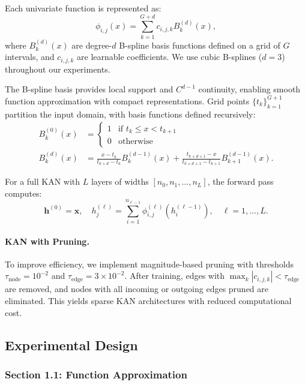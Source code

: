 \documentclass[11pt,a4paper]{article}
\begin{document}
Each univariate function is represented as:
\begin{equation}
\phi_{i,j}(x) = \sum_{k=1}^{G+d} c_{i,j,k} B_k^{(d)}(x),
\end{equation}
where $B_k^{(d)}(x)$ are degree-$d$ B-spline basis functions defined on a grid of $G$ intervals, and $c_{i,j,k}$ are learnable coefficients. We use cubic B-splines ($d=3$) throughout our experiments.

The B-spline basis provides local support and $C^{d-1}$ continuity, enabling smooth function approximation with compact representations. Grid points $\{t_k\}_{k=1}^{G+1}$ partition the input domain, with basis functions defined recursively:
\begin{align}
B_k^{(0)}(x) &= \begin{cases} 1 & \text{if } t_k \le x < t_{k+1} \\ 0 & \text{otherwise} \end{cases} \\
B_k^{(d)}(x) &= \frac{x - t_k}{t_{k+d} - t_k} B_k^{(d-1)}(x) + \frac{t_{k+d+1} - x}{t_{k+d+1} - t_{k+1}} B_{k+1}^{(d-1)}(x).
\end{align}

For a full KAN with $L$ layers of widths $[n_0, n_1, \ldots, n_L]$, the forward pass computes:
\begin{equation}
\mathbf{h}^{(0)} = \mathbf{x}, \quad h_j^{(\ell)} = \sum_{i=1}^{n_{\ell-1}} \phi_{i,j}^{(\ell)}(h_i^{(\ell-1)}), \quad \ell = 1, \ldots, L.
\end{equation}

\paragraph{KAN with Pruning.} To improve efficiency, we implement magnitude-based pruning with thresholds $\tau_{\text{node}} = 10^{-2}$ and $\tau_{\text{edge}} = 3 \times 10^{-2}$. After training, edges with $\max_k |c_{i,j,k}| < \tau_{\text{edge}}$ are removed, and nodes with all incoming or outgoing edges pruned are eliminated. This yields sparse KAN architectures with reduced computational cost.

\subsection{Experimental Design}

\subsubsection{Section 1.1: Function Approximation}
\end{document}
